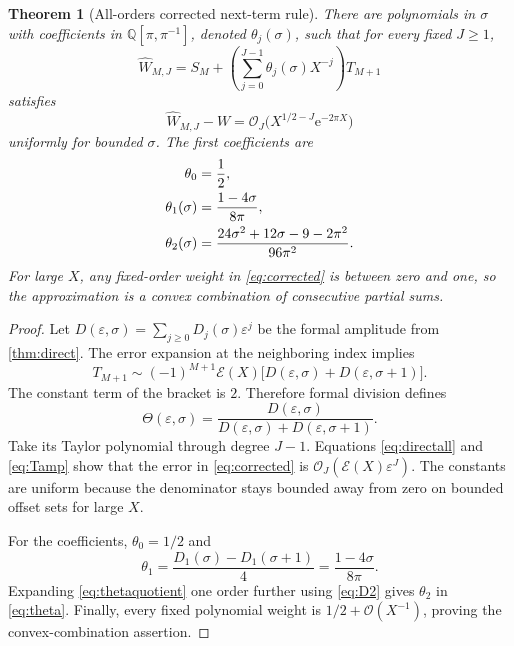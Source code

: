 \documentclass[11pt,a4paper]{article}
\newtheorem{theorem}{Theorem}[section]
\theoremstyle{definition}
\numberwithin{equation}{section}
\newcommand{\e}{\mathrm e}
\newcommand{\Oh}{\mathcal O}
\newcommand{\scal}{\mathcal E}
\begin{document}
\begin{theorem}[All-orders corrected next-term rule]
\label{thm:corrected}
There are polynomials in $\sigma$ with coefficients in $\mathbb Q[\pi,\pi^{-1}]$, denoted $\theta_j(\sigma)$, such that for every fixed $J\ge1$,
\begin{equation}
 \widehat W_{M,J}=S_M+
       \left(\sum_{j=0}^{J-1}\theta_j(\sigma)X^{-j}\right)T_{M+1}
 \label{eq:corrected}
\end{equation}
satisfies
\begin{equation}
 \widehat W_{M,J}-W=\Oh_J\bigl(X^{1/2-J}\e^{-2\pi X}\bigr)
 \label{eq:correctedbound}
\end{equation}
uniformly for bounded $\sigma$. The first coefficients are
\begin{align}
 \theta_0&=\frac12,\notag\\
 \theta_1(\sigma)&=\frac{1-4\sigma}{8\pi},\notag\\
 \theta_2(\sigma)&=\frac{24\sigma^2+12\sigma-9-2\pi^2}{96\pi^2}.
 \label{eq:theta}
\end{align}
For large $X$, any fixed-order weight in \eqref{eq:corrected} is between zero and one, so the approximation is a convex combination of consecutive partial sums.
\end{theorem}
\begin{proof}
Let $D(\varepsilon,\sigma)=\sum_{j\ge0}D_j(\sigma)\varepsilon^j$ be the formal amplitude from \cref{thm:direct}. The error expansion at the neighboring index implies
\begin{equation}
 T_{M+1}\sim(-1)^{M+1}\scal(X)
       \bigl[D(\varepsilon,\sigma)+D(\varepsilon,\sigma+1)\bigr].
 \label{eq:Tamp}
\end{equation}
The constant term of the bracket is $2$. Therefore formal division defines
\begin{equation}
 \Theta(\varepsilon,\sigma)=
 \frac{D(\varepsilon,\sigma)}
      {D(\varepsilon,\sigma)+D(\varepsilon,\sigma+1)}.
 \label{eq:thetaquotient}
\end{equation}
Take its Taylor polynomial through degree $J-1$. Equations \eqref{eq:directall} and \eqref{eq:Tamp} show that the error in \eqref{eq:corrected} is $\Oh_J(\scal(X)\varepsilon^J)$. The constants are uniform because the denominator stays bounded away from zero on bounded offset sets for large $X$.

For the coefficients, $\theta_0=1/2$ and
\[
 \theta_1=\frac{D_1(\sigma)-D_1(\sigma+1)}4
          =\frac{1-4\sigma}{8\pi}.
\]
Expanding \eqref{eq:thetaquotient} one order further using \eqref{eq:D2} gives $\theta_2$ in \eqref{eq:theta}. Finally, every fixed polynomial weight is $1/2+\Oh(X^{-1})$, proving the convex-combination assertion.
\end{proof}
\end{document}
